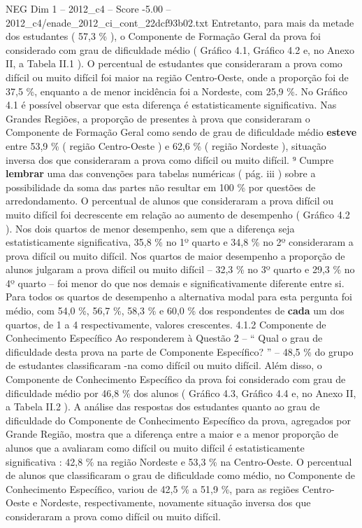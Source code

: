\begin{textsample}{NEG Dim 1 – 2012\_c4 – Score -5.00 – 2012\_c4/enade\_2012\_ci\_cont\_22dcf93b02.txt}
Entretanto, para mais da metade dos estudantes ( 57,3 \% ), o Componente de Formação Geral da prova foi considerado com grau de dificuldade médio ( Gráfico 4.1, Gráfico 4.2 e, no Anexo II, a Tabela II.1 ).
O percentual de estudantes que consideraram a prova como difícil ou muito difícil foi maior na região Centro-Oeste, onde a proporção foi de 37,5 \%, enquanto a de menor incidência foi a Nordeste, com 25,9 \%.
No Gráfico 4.1 é possível observar que esta diferença é estatisticamente significativa.
Nas Grandes Regiões, a proporção de presentes à prova que consideraram o Componente de Formação Geral como sendo de grau de dificuldade médio \textbf{esteve} entre 53,9 \% ( região Centro-Oeste ) e 62,6 \% ( região Nordeste ), situação inversa dos que consideraram a prova como difícil ou muito difícil. ⁹ Cumpre \textbf{lembrar} uma das convenções para tabelas numéricas ( pág. iii ) sobre a possibilidade da soma das partes não resultar em 100 \% por questões de arredondamento.
O percentual de alunos que consideraram a prova difícil ou muito difícil foi decrescente em relação ao aumento de desempenho ( Gráfico 4.2 ).
Nos dois quartos de menor desempenho, sem que a diferença seja estatisticamente significativa, 35,8 \% no 1º quarto e 34,8 \% no 2º consideraram a prova difícil ou muito difícil.
Nos quartos de maior desempenho a proporção de alunos julgaram a prova difícil ou muito difícil – 32,3 \% no 3º quarto e 29,3 \% no 4º quarto – foi menor do que nos demais e significativamente diferente entre si.
Para todos os quartos de desempenho a alternativa modal para esta pergunta foi médio, com 54,0 \%, 56,7 \%, 58,3 \% e 60,0 \% dos respondentes de \textbf{cada} um dos quartos, de 1 a 4 respectivamente, valores crescentes. 4.1.2 Componente de Conhecimento Específico Ao responderem à Questão 2 – “ Qual o grau de dificuldade desta prova na parte de Componente Específico? ” – 48,5 \% do grupo de estudantes classificaram -na como difícil ou muito difícil.
Além disso, o Componente de Conhecimento Específico da prova foi considerado com grau de dificuldade médio por 46,8 \% dos alunos ( Gráfico 4.3, Gráfico 4.4 e, no Anexo II, a Tabela II.2 ).
A análise das respostas dos estudantes quanto ao grau de dificuldade do Componente de Conhecimento Específico da prova, agregados por Grande Região, mostra que a diferença entre a maior e a menor proporção de alunos que a avaliaram como difícil ou muito difícil é estatisticamente significativa : 42,8 \% na região Nordeste e 53,3 \% na Centro-Oeste.
O percentual de alunos que classificaram o grau de dificuldade como médio, no Componente de Conhecimento Específico, variou de 42,5 \% a 51,9 \%, para as regiões Centro-Oeste e Nordeste, respectivamente, novamente situação inversa dos que consideraram a prova como difícil ou muito difícil.

\end{textsample}
